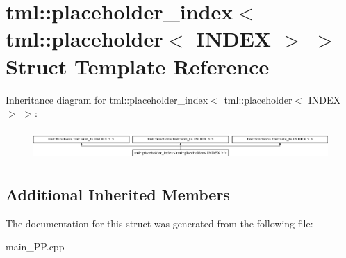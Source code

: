 \hypertarget{structtml_1_1placeholder__index_3_01tml_1_1placeholder_3_01INDEX_01_4_01_4}{\section{tml\+:\+:placeholder\+\_\+index$<$ tml\+:\+:placeholder$<$ I\+N\+D\+E\+X $>$ $>$ Struct Template Reference}
\label{structtml_1_1placeholder__index_3_01tml_1_1placeholder_3_01INDEX_01_4_01_4}
}
Inheritance diagram for tml\+:\+:placeholder\+\_\+index$<$ tml\+:\+:placeholder$<$ I\+N\+D\+E\+X $>$ $>$\+:\begin{figure}[H]
\begin{center}
\leavevmode
\includegraphics[height=1.170324cm]{structtml_1_1placeholder__index_3_01tml_1_1placeholder_3_01INDEX_01_4_01_4}
\end{center}
\end{figure}
\subsection*{Additional Inherited Members}


The documentation for this struct was generated from the following file\+:\begin{DoxyCompactItemize}
\item 
main\+\_\+\+P\+P.\+cpp\end{DoxyCompactItemize}
